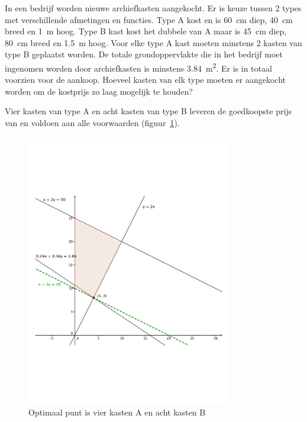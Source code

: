 \begin{oef}
In een bedrijf worden nieuwe archiefkasten aangekocht. Er
     is keuze tussen 2 types met verschillende afmetingen en
     functies. Type A kost  en is \SI{60}{\cm} diep, \SI{40}{\cm} breed en
     \SI{1}{\m} hoog. Type B kast kost het dubbele van A maar is \SI{45}{\cm}
     diep, \SI{80}{\centi\meter} breed en \SI{1,5}{\meter} hoog. Voor elke type A kast moeten
     minstens 2 kasten van type B geplaatst worden. De totale
     grondoppervlakte die in het bedrijf moet ingenomen worden door
     archiefkasten is minstens \SI{3,84}{\square\meter}. Er is in totaal 
     voorzien voor de aankoop. Hoeveel kasten van elk type moeten
     er aangekocht worden om de kostprijs zo laag mogelijk te houden? 
     \begin{opl}
     Vier kasten van type A en acht kasten van type  B leveren de goedkoopste prijs van  en voldoen aan alle voorwaarden (figuur~\ref{fig:kastenAB}).
          \begin{figure}[hbtp]
\centering
\includegraphics[width=0.8\textwidth]{oefeningen/FigurenLP/OefkastenAB.pdf}
\caption{Optimaal punt is vier kasten A en acht kasten B}
\label{fig:kastenAB}
\end{figure}
     \end{opl}
\end{oef}
     
